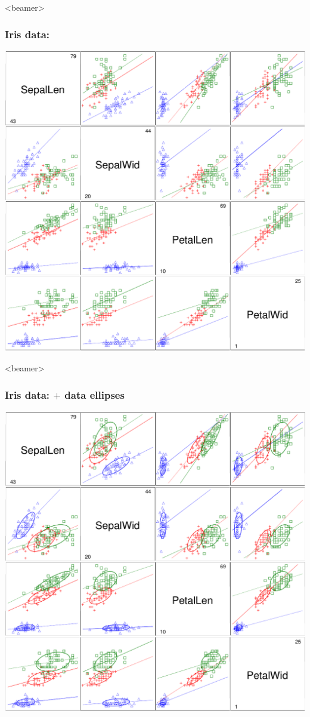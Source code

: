 \begin{frame}<beamer>
  \frametitle{Iris data: \scatmat}
  \begin{center}
  \includegraphics[height=.8\textheight,clip]{fig/scatirise}
  \end{center}

\end{frame}

\begin{frame}<beamer>
  \frametitle{Iris data: \scatmat $+$ data ellipses}
  \begin{center}
  \includegraphics[height=.8\textheight,clip]{fig/scatirisd1}
  \end{center}
\end{frame}

